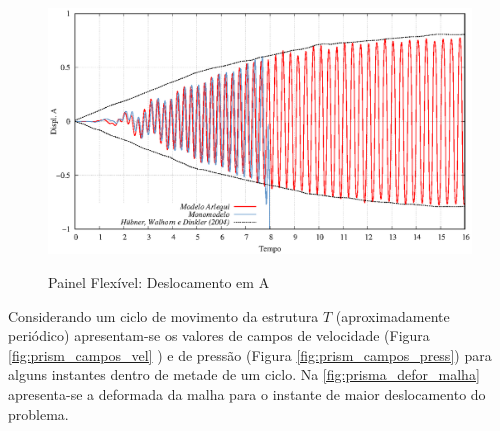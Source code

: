 \begin{figure}[!htbp]
	\caption{Painel Flexível: Deslocamento em A}
	\centering 
	\includegraphics[scale=1.0,trim=0cm 0cm 0cm 0cm, clip=true]{Imagens/Cap7/prisma_deslA.eps}	
	\label{fig:prisma_deslA}
\end{figure}

Considerando um ciclo de movimento da estrutura $T$ (aproximadamente periódico) apresentam-se os valores de campos de velocidade (Figura \ref{fig:prism_campos_vel} ) e de pressão (Figura \ref{fig:prism_campos_press}) para alguns instantes dentro de metade de um ciclo. Na \autoref{fig:prisma_defor_malha} apresenta-se a deformada da malha para o instante de maior deslocamento do problema.

